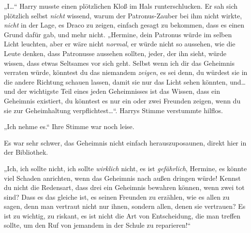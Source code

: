 „I…“ Harry musste einen plötzlichen Kloß im Hals runterschlucken. Er sah sich plötzlich selbst \emph{nicht} wissend, warum der Patronus-Zauber bei ihm nicht wirkte, \emph{nicht} in der Lage, es Draco zu zeigen, einfach gesagt zu bekommen, dass es einen Grund dafür gab, und mehr nicht. „Hermine, dein Patronus würde im selben Licht leuchten, aber er wäre nicht \emph{normal}, er würde nicht so aussehen, wie die Leute denken, dass Patronusse aussehen sollten, jeder, der ihn sieht, würde wissen, dass etwas Seltsames vor sich geht. Selbst wenn ich dir das Geheimnis verraten würde, könntest du das niemandem \emph{zeigen}, es sei denn, du würdest sie in die andere Richtung schauen lassen, damit sie nur das Licht sehen könnten, und…und der wichtigste Teil eines jeden Geheimnisses ist das Wissen, dass ein Geheimnis existiert, du könntest es nur ein oder zwei Freunden zeigen, wenn du sie zur Geheimhaltung verpflichtest…“. Harrys Stimme verstummte hilflos.

„Ich nehme es.“ Ihre Stimme war noch leise.

Es war sehr schwer, das Geheimnis nicht einfach herauszuposaunen, direkt hier in der Bibliothek.

„Ich, ich sollte nicht, ich sollte \emph{wirklich} nicht, es ist \emph{gefährlich}, Hermine, es könnte viel Schaden anrichten, wenn das Geheimnis nach außen dringen würde! Kennst du nicht die Redensart, dass drei ein Geheimnis bewahren können, wenn zwei tot sind? Dass es das gleiche ist, es seinen Freunden zu erzählen, wie es allen zu sagen, denn man vertraut nicht nur ihnen, sondern allen, denen sie vertrauen? Es ist zu wichtig, zu riskant, es ist nicht die Art von Entscheidung, die man treffen sollte, um den Ruf von jemandem in der Schule zu reparieren!“


